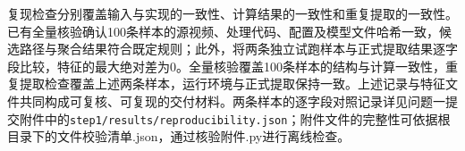 复现检查分别覆盖输入与实现的一致性、计算结果的一致性和重复提取的一致性。已有全量核验确认100条样本的源视频、处理代码、配置及模型文件哈希一致，候选路径与聚合结果符合既定规则；此外，将两条独立试跑样本与正式提取结果逐字段比较，特征的最大绝对差为0。全量核验覆盖100条样本的结构与计算一致性，重复提取检查覆盖上述两条样本，运行环境与正式提取保持一致。上述记录与特征文件共同构成可复核、可复现的交付材料。两条样本的逐字段对照记录详见问题一提交附件中的\nolinkurl{step1/results/reproducibility.json}；附件文件的完整性可依据根目录下的\textnormal{文件校验清单.json}，通过\textnormal{核验附件.py}进行离线检查。
